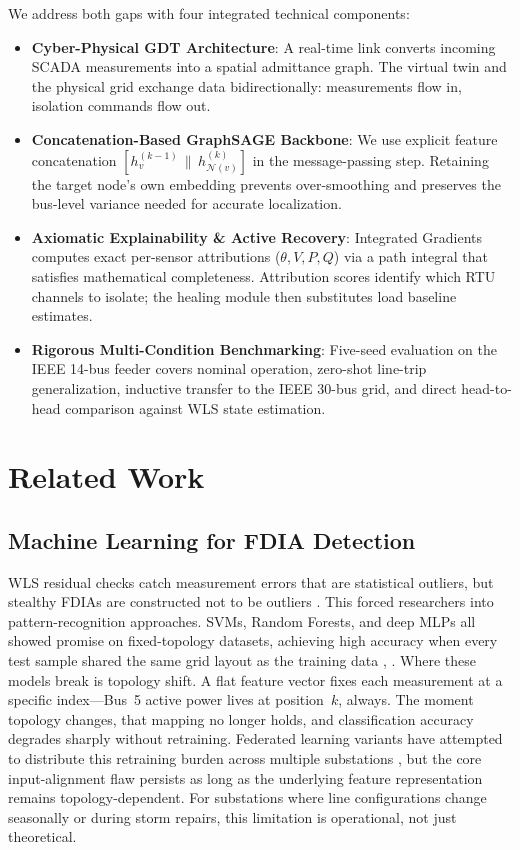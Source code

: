 \documentclass[conference]{IEEEtran}
\begin{document}
We address both gaps with four integrated technical components:
\begin{itemize}
    \item \textbf{Cyber-Physical GDT Architecture}: A real-time link converts incoming SCADA measurements into a spatial admittance graph. The virtual twin and the physical grid exchange data bidirectionally: measurements flow in, isolation commands flow out.
    \item \textbf{Concatenation-Based GraphSAGE Backbone}: We use explicit feature concatenation $[h_v^{(k-1)} \,\|\, h_{\mathcal{N}(v)}^{(k)}]$ in the message-passing step. Retaining the target node's own embedding prevents over-smoothing and preserves the bus-level variance needed for accurate localization.
    \item \textbf{Axiomatic Explainability \& Active Recovery}: Integrated Gradients computes exact per-sensor attributions ($\theta, V, P, Q$) via a path integral that satisfies mathematical completeness. Attribution scores identify which RTU channels to isolate; the healing module then substitutes load baseline estimates.
    \item \textbf{Rigorous Multi-Condition Benchmarking}: Five-seed evaluation on the IEEE 14-bus feeder covers nominal operation, zero-shot line-trip generalization, inductive transfer to the IEEE 30-bus grid, and direct head-to-head comparison against WLS state estimation.
\end{itemize}

\section{Related Work}

\subsection{Machine Learning for FDIA Detection}

WLS residual checks catch measurement errors that are statistical outliers, but stealthy FDIAs are constructed not to be outliers \cite{b3}. This forced researchers into pattern-recognition approaches. SVMs, Random Forests, and deep MLPs all showed promise on fixed-topology datasets, achieving high accuracy when every test sample shared the same grid layout as the training data \cite{b5}, \cite{b6}. Where these models break is topology shift. A flat feature vector fixes each measurement at a specific index---Bus~5 active power lives at position~$k$, always. The moment topology changes, that mapping no longer holds, and classification accuracy degrades sharply without retraining. Federated learning variants have attempted to distribute this retraining burden across multiple substations \cite{b12}, but the core input-alignment flaw persists as long as the underlying feature representation remains topology-dependent. For substations where line configurations change seasonally or during storm repairs, this limitation is operational, not just theoretical.
\end{document}
